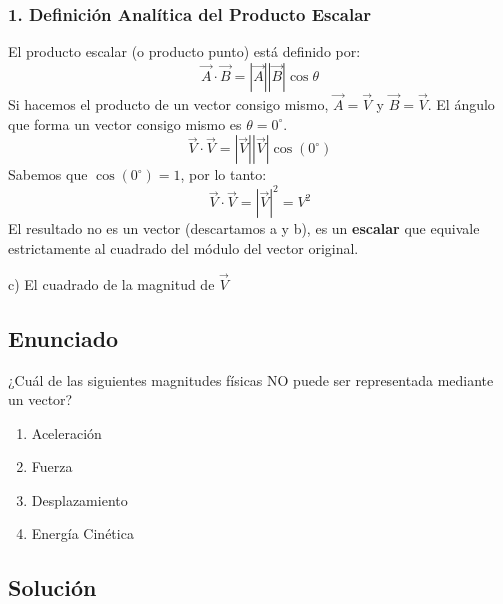 \documentclass[12pt, a4paper]{article}
\begin{document}
\subsubsection*{1. Definición Analítica del Producto Escalar}
El producto escalar (o producto punto) está definido por:
$$ \vec{A} \cdot \vec{B} = |\vec{A}| |\vec{B}| \cos\theta $$
Si hacemos el producto de un vector consigo mismo, $\vec{A} = \vec{V}$ y $\vec{B} = \vec{V}$. El ángulo que forma un vector consigo mismo es $\theta = 0^\circ$.
$$ \vec{V} \cdot \vec{V} = |\vec{V}| |\vec{V}| \cos(0^\circ) $$
Sabemos que $\cos(0^\circ) = 1$, por lo tanto:
$$ \vec{V} \cdot \vec{V} = |\vec{V}|^2 = V^2 $$
El resultado no es un vector (descartamos a y b), es un \textbf{escalar} que equivale estrictamente al cuadrado del módulo del vector original.

\begin{tcolorbox}[colback=green!5!white, colframe=green!50!black, title=Respuesta Final]
\centering \Large c) El cuadrado de la magnitud de $\vec{V}$
\end{tcolorbox}

\newpage


\subsection*{Enunciado}
¿Cuál de las siguientes magnitudes físicas NO puede ser representada mediante un vector?
\begin{enumerate}[label=\alph*)]
    \item Aceleración
    \item Fuerza
    \item Desplazamiento
    \item Energía Cinética
\end{enumerate}

\subsection*{Solución}
\end{document}
